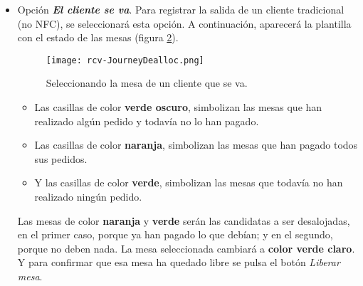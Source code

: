 \begin{itemize}
Cuando llega un cliente \acs{NFC}, no hace falta seleccionar la opción
\emph{Ha llegado un cliente}, sino que, cuando el dispositivo móvil del
cliente conecta con esta aplicación se muestra una interfaz similar a la
de la figura \ref{fig:rcv-JourneyNewClient}, pero esta vez con los datos
personalizados del cliente \acs{NFC} (figura
\ref{fig:rcv-JourneyNewClientNFC}).

  \begin{figure}[ht]
    \begin{center}
      \texttt{[image: rcv-JourneyNewClientNFC.png]}
      \caption{Ha llegado un cliente \acs{NFC}.}
      \label{fig:rcv-JourneyNewClientNFC}
    \end{center}
  \end{figure}

Una vez especificado del número de comensales, se pulsa \emph{Aceptar} y
se elige una de las mesas \emph{libres}, como se hizo en el caso del
cliente tradicional.

\item Opción \textbf{\emph{El cliente se va}}. Para registrar la salida de un
cliente tradicional (no \acs{NFC}), se seleccionará esta opción. A
continuación, aparecerá la plantilla con el estado de las mesas (figura
\ref{fig:rcv-JourneyDealloc}).

  \begin{figure}[ht]
    \begin{center}
      \texttt{[image: rcv-JourneyDealloc.png]}
      \caption{Seleccionando la mesa de un cliente que se va.}
      \label{fig:rcv-JourneyDealloc}
    \end{center}
  \end{figure}

  \begin{itemize}
  \item Las casillas de color \textbf{verde oscuro}, simbolizan las mesas que
  han realizado algún pedido y todavía no lo han pagado.
  \item Las casillas de color \textbf{naranja}, simbolizan las mesas que han
  pagado todos sus pedidos.
  \item Y las casillas de color \textbf{verde}, simbolizan las mesas que
  todavía no han realizado ningún pedido.
  \end{itemize}

  Las mesas de color \textbf{naranja} y \textbf{verde} serán las candidatas a
  ser desalojadas, en el primer caso, porque ya han pagado lo que debían; y en
  el segundo, porque no deben nada. La mesa seleccionada cambiará a
  \textbf{color verde claro}. Y para confirmar que esa mesa ha quedado libre
  se pulsa el botón \emph{Liberar mesa}.


\end{itemize}
